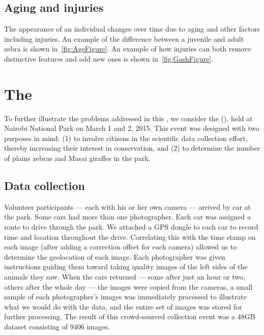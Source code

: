         \IlluminationFigure{}

        \QualityFigure{}

    \subsection{Aging and injuries}
        The appearance of an individual changes over time due to aging
          and other factors including injuries.
        An example of the difference between a juvenile and adult zebra
          is shown in~\cref{fig:AgeFigure}.
        An example of how injuries can both remove distinctive features
          and add new ones is shown in~\cref{fig:GashFigure}.

        \AgeFigure{}

        \GashFigure{}

\section{The \GZCFull{}}\label{sec:introgzc}

    To further illustrate the problems addressed in this \thesis{}, we
      consider the \GZCFull{} (\GZC{}), held at Nairobi National Park on
      March 1\st{} and 2\nd{}, 2015.
    This event was designed with two purposes in mind:
    (1) to involve citizens in the scientific data collection effort,
      thereby increasing their interest in conservation, and
    (2) to determine the number of plains zebras and Masai giraffes in
      the park.

    \subsection{Data collection}
        Volunteer participants --- each with his or her own camera ---
          arrived by car at the park.
        Some cars had more than one photographer.
        Each car was assigned a route to drive through the park.
        We attached a GPS dongle to each car to record time and
          location throughout the drive.
        Correlating this with the time stamp on each image (after
          adding a correction offset for each camera) allowed us to
          determine the geolocation of each image.
        Each photographer was given instructions guiding them toward
          taking quality images of the left sides of the animals they
          saw.
        When the cars returned --- some after just an hour or two,
          others after the whole day --- the images were copied from the
          cameras, a small sample of each photographer's images was
          immediately processed to illustrate what we would do with the
          data, and the entire set of images was stored for further
          processing.
        The result of this crowd-sourced collection event was a 48GB
          dataset consisting of $9406$ images.

